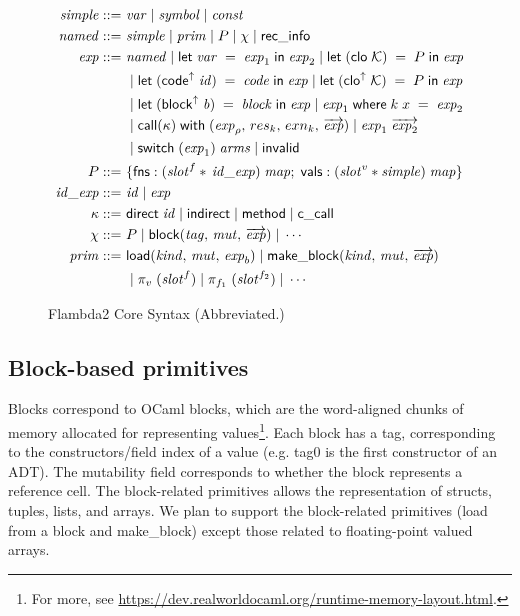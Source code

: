 \documentclass[11pt,fleqn]{amsart}
\begin{document}
\newcommand{\eval}[2]{\langle #1, \, #2\rangle}
\newcommand{\rebind}[3]{#1 \; [ #2 \mapsto #3 ]}

\begin{figure}[ht]
  \footnotesize
  \begin{align*}
    \mathit{simple} ::=~& \mathit{var} \; | \; \mathit{symbol} \; | \; \mathit{const} \\
    \mathit{named} ::=~& \mathit{simple} \; | \; \mathit{prim} \; | \; P \; | \; \chi \; | \; \mathsf{rec\_info} \\
    \mathit{exp} ::=~& \mathit{named} \; | \; \mathsf{let}\; \mathit{var} \; = \; \mathit{exp}_1 \; \mathsf{in} \; \mathit{exp}_2 \; | \; \mathsf{let}\; (\mathsf{clo} \; \mathcal{K}) \; = \; P \; \mathsf{in} \; \mathit{exp}\\
    & \; | \; \mathsf{let}\; (\mathsf{code}^{\uparrow} \; \mathit{id}) \; = \; \mathit{code} \; \mathsf{in} \; \mathit{exp} \; | \; \mathsf{let}\; (\mathsf{clo}^{\uparrow} \; \mathcal{K}) \; = \; P \; \mathsf{in} \; \mathit{exp} \\
    & \; | \; \mathsf{let}\; (\mathsf{block}^{\uparrow} \; \mathit{b}) \; = \; \mathit{block} \; \mathsf{in} \; \mathit{exp} \; | \; \mathit{exp}_1 \; \mathsf{where} \; k \; x \; = \; \mathit{exp}_2 \\
    & \; | \; \mathsf{call}(\kappa) \; \mathsf{with} \; (\mathit{exp}_{\rho}, \, res_k, \, exn_k, \, \overrightarrow{\mathit{exp}}) \; | \; \mathit{exp}_1 \; \overrightarrow{\mathit{exp}_2} \\
    & \; | \; \mathsf{switch}\; (\mathit{exp}_1) \; \mathit{arms} \; | \; \mathsf{invalid} \\
    P ::=~& \{ \mathsf{fns} : (\mathit{slot}^{f} \ast \, \mathit{id\_exp} ) \; \mathit{map} ; \;
    \mathsf{vals} : (\mathit{slot}^{v} \ast \mathit{simple}) \; \mathit{map} \}\\
    \mathit{id\_exp} ::=~& \mathit{id} \; | \; \mathit{exp} \\
    \kappa ::=~& \mathsf{direct} \; \mathit{id} \; | \; \mathsf{indirect} \; | \; \mathsf{method} \; | \; \mathsf{c\_call} \\
    \chi ::=~& P \; | \; \mathsf{block}(\mathit{tag},\,\mathit{mut},\,\overrightarrow{\mathit{exp}}) \; | \; \cdots \\
    \mathit{prim} ::=~& \mathsf{load}(\mathit{kind},\,\mathit{mut},\,\mathit{exp}_b) \; | \; \mathsf{make\_block}(\mathit{kind},\,\mathit{mut},\,\overrightarrow{\mathit{exp}}) \\
    & \; | \; \pi_{v} \; (\mathit{slot}^{f}) \; | \; \pi_{f_1} \; (\mathit{slot}^{f_2}) \; | \; \cdots
  \end{align*}
  \caption{Flambda2 Core Syntax (Abbreviated.) }
  \label{fig:syntax}
\end{figure}

\subsection{Block-based primitives}
Blocks correspond to OCaml blocks, which are the word-aligned chunks of memory allocated for representing values\footnote{For more, see \url{https://dev.realworldocaml.org/runtime-memory-layout.html}. }.
Each block has a tag, corresponding to the constructors/field index of a value (e.g. \textsf{tag0} is the first constructor of an ADT).
The mutability field corresponds to whether the block represents a reference cell.
The block-related primitives allows the representation of structs, tuples, lists, and arrays.
We plan to support the block-related primitives (\textsf{load} from a block and \textsf{make\_block}) except those related to floating-point valued arrays.
\end{document}
